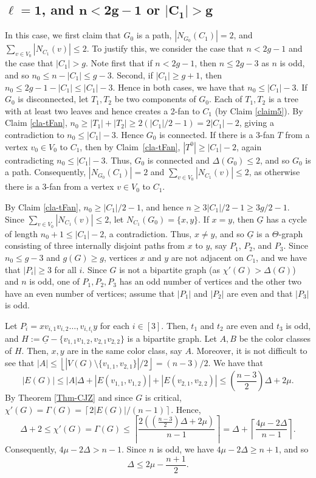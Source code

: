 \documentclass[12pt,oneside]{amsart}
\newcommand\roundup[1]{\left\lceil#1\right\rceil}
\newcommand\rounddown[1]{\left\lfloor#1\right\rfloor}
\begin{document}
\subsection{\texorpdfstring{${\mathbf{\ell= 1}}$}{l=1}, and \texorpdfstring{${\mathbf{n<2g-1}}$}{n<2g-1} or \texorpdfstring{$\mathbf{ |C_1| > g}$}{|C1|>g}}
In this case, we first claim that $G_0$ is a path,   $|N_{G_0}(C_1)|=2$, and $\sum_{v\in V_0}|N_{C_1}(v)| \le 2$.
To justify this, we consider the case that $n<2g-1$ and the case that $|C_1|>g$.
Note first that if $n< 2g-1$, then $n \le 2g -3$
as $n$ is odd,  and so $n_0 \le n -|C_1| \le g-3$. Second, if $|C_1| \ge g+1$, then $n_0 \le 2g-1-|C_1|\le |C_1| -3$. Hence in both cases, we have that $n_0\le |C_1| -3$.
If $G_0$ is disconnected, let $T_1, T_2$ be two components of $G_0$. Each of $T_1, T_2$ is a tree with at least two leaves and hence creates a 2-fan to $C_1$ (by Claim \ref{claim5}).   By Claim \ref{cla-tFan}, $n_0 \ge |T_1|+ |T_2| \ge 2(|C_1|/2 -1) =2|C_1| -2$, giving a contradiction to $n_0 \le |C_1| -3$.
Hence  $G_0$ is connected. If there is a $3$-fan $T$ from a vertex $v_0\in V_0$ to $C_1$, then by Claim~\ref{cla-tFan}, $|T^0| \ge |C_1|-2$, again contradicting $n_0\leq |C_1|-3$.  Thus, $G_0$ is connected and $\Delta(G_0) \le 2$, and so $G_0$ is a path. Consequently,  $|N_{G_0}(C_1)|=2$ and $\sum_{v\in V_0}|N_{C_1}(v)| \le 2$, as otherwise there is a $3$-fan from a vertex $v\in V_0$ to $C_1$.

By Claim \ref{cla-tFan},  $n_0\geq |C_1|/2-1$, and hence  $n\geq 3|C_1|/2 -1 \ge 3g/2-1$.
Since $\sum_{v\in V_0}|N_{C_1}(v)| \le 2$,
let $N_{C_1}(G_0) = \{x, y\}$. If $x=y$, then $\underline{G}$ has a cycle of length $n_0+1 \le |C_1|-2$, a contradiction.  Thus, $x\ne y$,  and so $\underline{G}$ is a $\Theta$-graph consisting of three internally disjoint paths from $x$ to $y$, say $P_1$, $P_2$, and $P_3$. Since $n_0\le g-3$ and $g(G) \ge g$, vertices $x$ and $y$ are not adjacent on $C_1$, and we have that $|P_i|\geq 3$ for all $i$. Since $G$ is not a bipartite graph (as $\chi'(G) > \Delta(G)$) and $n$ is odd, one of $P_1, P_2, P_3$ has an odd number of vertices and the other two have an even number of vertices; assume that $|P_1|$ and $|P_2|$ are even and that $|P_3|$ is odd.

Let $P_i = xv_{i,1}v_{i,2} \dots, v_{i, t_i} y$ for each $i\in [3]$. Then, $t_1$ and $t_2$ are even and $t_3$ is odd, and $H:=\underline{G}-\{v_{1,1}v_{1,2}, v_{2,1}v_{2,2}\}$ is a bipartite graph. Let $A, B$  be the color classes of $H$. Then, $x, y$ are in the same color class, say $A$. Moreover, it is not difficult to see that $|A| \le \rounddown{|V(G)\setminus\{v_{1,1}, v_{2,1}\}|/2} = (n-3)/2$.    We have that
$$
|E(G)|\leq |A| \Delta +|E(v_{1,1}, v_{1,2})| + |E(v_{2,1}, v_{2,2})| \leq \left(\dfrac{n-3}{2}\right)\Delta+2\mu.
$$
By Theorem \ref{Thm-CJZ} and since $G$ is critical,  $\chi'(G)=\Gamma(G) =\roundup{2|E(G)|/(n-1)}$. Hence,
$$\Delta+2 \leq \chi'(G)=\Gamma(G) \leq \left\lceil \frac{2\left(\left(\tfrac{n-3}{2}\right)\Delta+2\mu\right)}{n-1}\right\rceil=\Delta+\left\lceil\frac{4\mu-2\Delta}{n-1}\right\rceil.  $$
Consequently,  $4\mu-2\Delta> n-1$.
Since $n$ is odd, we have $4\mu-2\Delta\geq n+1$, and so
\[
\Delta\leq 2\mu-\dfrac{n+1}{2}.
\]
\end{document}
